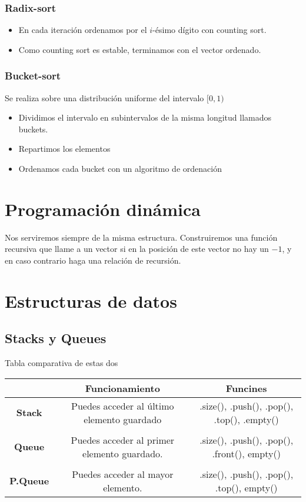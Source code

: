 \documentclass{myclass}
\begin{document}
\subsubsection{Radix-sort}
\begin{itemize}
  \item En cada iteración ordenamos por el $i$-ésimo dígito con counting sort.
  \item Como counting sort es estable, terminamos con el vector ordenado.
\end{itemize}

\subsubsection{Bucket-sort}
Se realiza sobre una distribución uniforme del intervalo $[0, 1)$
\begin{itemize}
  \item Dividimos el intervalo en subintervalos de la misma longitud llamados buckets.
  \item Repartimos los elementos
  \item Ordenamos cada bucket con un algoritmo de ordenación
\end{itemize}

\section{Programación dinámica}
Nos serviremos siempre de la misma estructura. Construiremos una función recursiva que llame a un vector si en la posición de este vector no hay un $-1$, y en caso contrario haga una relación de recursión.



\section{Estructuras de datos}
\subsection{Stacks y Queues}
Tabla comparativa de estas dos
\begin{table}[h!]
    \centering
    \begin{tabular}{c|cc}
        & \textbf{Funcionamiento} & \textbf{Funcines} \\
        \hline
        \textbf{Stack} & Puedes acceder al último elemento guardado &  .size(), .push(), .pop(), .top(), .empty()\\
        \\
        \textbf{Queue} & Puedes acceder al primer elemento guardado.  & .size(), .push(), .pop(), .front(), empty() \\
        \\
        \textbf{P.Queue} & Puedes acceder al mayor elemento.  & .size(), .push(), .pop(), .top(), empty() \\
    \end{tabular}
\end{table}
\end{document}
